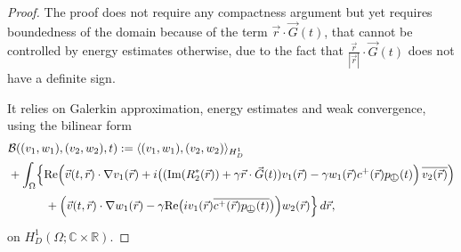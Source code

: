 \documentclass{ws-m3as}
\renewcommand\Re{\mathrm{Re}}
\renewcommand\Im{\mathrm{Im}}
\def\pp{p_{\perp\!\!\!\!\!\bigcirc}}
\begin{document}
\begin{proof}
The proof does not require any compactness argument 
but yet requires boundedness of the domain because of the term $\vec r\cdot \vec G(t)$, that cannot be controlled by energy estimates otherwise, due to the fact that $\frac{\vec r}{|\vec r|}\cdot \vec G(t)$ does not have a definite sign.
 
It relies on Galerkin approximation,  
energy estimates and weak convergence, using the bilinear form 
\[
\begin{aligned}
&\mathcal{B}((v_1,w_1),(v_2,w_2),t)
:= 
\langle (v_1,w_1),(v_2,w_2)\rangle_{H_D^1}\\
&+\int_\Omega\Bigl\{\Re\Bigl( {\vec v}(t, \vec r)\cdot\nabla v_1(\vec r)
+i\bigl((\Im(R_2^*(\vec r))+\gamma\vec r \cdot \vec G(t))v_1(\vec r)
-\gamma w_1(\vec r)c^+(\vec r)\pp(t)\Bigr)\, \overline{v_2(\vec r)}\Bigr)\\    
&\phantom{:= \int_\Omega\Bigl\{}
+\Bigl({\vec v}(t, \vec r)\cdot\nabla w_1(\vec r)
-\gamma\Re\bigl(iv_1(\vec r)\overline{c^+(\vec r)\pp(t)}\bigr)\Bigr)w_2(\vec r)\Bigr\}\, d \vec r,
\end{aligned}
\]
on $H_D^1(\Omega;\mathbb{C}\times\mathbb{R})$.
 

\end{proof}
\end{document}
